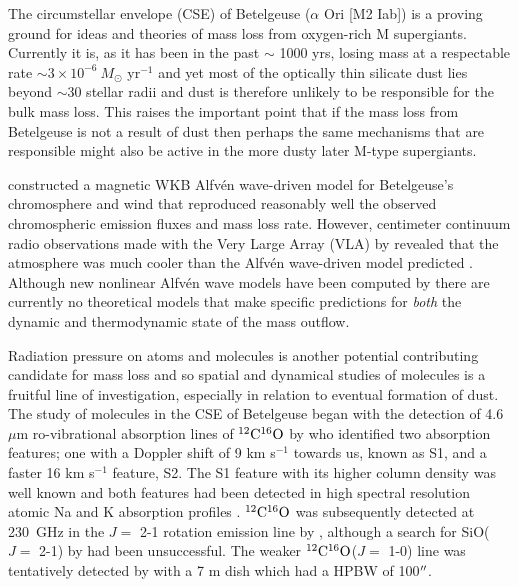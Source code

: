 \documentclass[apj]{emulateapj}
\begin{document}
The circumstellar envelope (CSE) of Betelgeuse ($\alpha$ Ori [M2 Iab]) is a proving ground for ideas and theories of mass loss from oxygen-rich M supergiants. Currently it is, as it has been in the past $\sim$ 1000 yrs, losing mass at a respectable rate $\sim 3\times 10^{-6} \ M{}_{\odot}$ yr${}^{-1}$\citep{1986ApJ...306..605G, 1994ApJ...424L.127H,harper_2001} and yet most of the optically thin silicate dust lies beyond $\sim 30$ stellar radii \citep{1994AJ....107.1469D} and dust is therefore unlikely to be responsible for the bulk mass loss. This raises the important point that if the mass loss from Betelgeuse is not a result of dust then perhaps the same mechanisms that are responsible might also be active in the more dusty later M-type supergiants. 

\cite{1984ApJ...284..238H} constructed a magnetic WKB Alfv\'{e}n wave-driven model for Betelgeuse's chromosphere and wind that reproduced reasonably well the observed chromospheric emission fluxes and mass loss rate. However, centimeter continuum radio observations made with the Very Large Array (VLA) by \cite{1998Natur.392..575L} revealed that the atmosphere was much cooler than the Alfv\'{e}n wave-driven model predicted \citep{harper_2001}. Although  new nonlinear Alfv\'{e}n wave models have been computed by \cite{2000ApJ...528..965A} there are currently no theoretical models that make specific predictions for {\em both} the dynamic and thermodynamic state of the mass outflow. 

Radiation pressure on atoms and molecules is another potential contributing candidate for mass loss and so spatial and dynamical studies of molecules is a fruitful line of investigation, especially in relation to eventual formation of dust. The study of molecules in the CSE of Betelgeuse began with the detection of 4.6 $\mu$m ro-vibrational absorption lines of $\rm{{}^{12}C^{16}O}$ by \cite{1979ApJ...233L.135B} who identified two absorption features; one with a Doppler shift of 9 km s${}^{-1}$ towards us, known as S1, and a faster 16 km s${}^{-1}$ feature, S2. The S1 feature with its higher column density was well known \citep[e.g.][]{1962ApJ...136..844W} and both features had been detected in high spectral resolution atomic Na and K absorption profiles \citep{1975ApJ...199..427G}. $\rm{{}^{12}C^{16}O}$ was subsequently detected at 230~GHz in the $J=$ 2-1 rotation emission line by \cite{1980ApJ...242L..25K}, although a search for SiO($J=$ 2-1) by \cite{1978ApJ...221..854L} had been unsuccessful. The weaker $\rm{{}^{12}C^{16}O}$($J=$ 1-0) line was tentatively detected by \cite{1985ApJ...292..640K} with a 7 m dish which had a HPBW of 100$\mbox{$^{\prime\prime}$}$.
\end{document}
